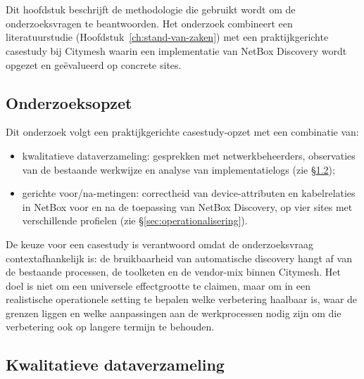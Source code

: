 
\chapter{}%
\label{ch:methodologie}

Dit hoofdstuk beschrijft de methodologie die gebruikt wordt om de onderzoeksvragen te beantwoorden. Het onderzoek combineert een literatuurstudie (Hoofdstuk~\ref{ch:stand-van-zaken}) met een praktijkgerichte casestudy bij Citymesh waarin een implementatie van NetBox Discovery wordt opgezet en geëvalueerd op concrete sites.

\section{Onderzoeksopzet}

Dit onderzoek volgt een praktijkgerichte casestudy-opzet met een combinatie van:
\begin{itemize}
  \item kwalitatieve dataverzameling: gesprekken met netwerkbeheerders, observaties van de bestaande werkwijze en analyse van implementatielogs (zie \S\ref{sec:kwalitatieve-data});
  \item gerichte voor/na-metingen: correctheid van device-attributen en kabelrelaties in NetBox voor en na de toepassing van NetBox Discovery, op vier sites met verschillende profielen (zie \S\ref{sec:operationalisering}).
\end{itemize}

De keuze voor een casestudy is verantwoord omdat de onderzoeksvraag contextafhankelijk is: de bruikbaarheid van automatische discovery hangt af van de bestaande processen, de toolketen en de vendor-mix binnen Citymesh. Het doel is niet om een universele effectgrootte te claimen, maar om in een realistische operationele setting te bepalen welke verbetering haalbaar is, waar de grenzen liggen en welke aanpassingen aan de werkprocessen nodig zijn om die verbetering ook op langere termijn te behouden.

\section{Kwalitatieve dataverzameling}
\label{sec:kwalitatieve-data}

